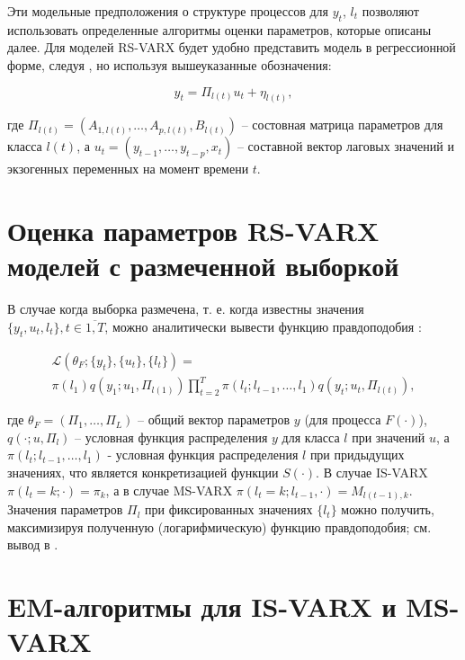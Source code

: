 \documentclass[a4paper,14pt]{extreport}
\begin{document}
Эти модельные предположения о структуре процессов для $y_t$, $l_t$ позволяют использовать определенные алгоритмы оценки параметров, которые описаны далее. Для моделей RS-VARX будет удобно представить модель в регрессионной форме, следуя \cite{malNovopMSVARX}, но используя вышеуказанные обозначения:

\begin{equation}
	y_t = \Pi_{l(t)} u_t + \eta_{l(t)} ,
	\label{eq:rs_varx_as_regression}
\end{equation}

\noindent
где $ \Pi_{l(t)} = (A_{1, l(t)}, \dots, A_{p, l(t)}, B_{l(t)}) $ -- состовная матрица параметров для класса $l(t)$, 
а $ u_t = (y_{t-1}, \dots, y_{t-p}, x_{t}) $ -- составной вектор лаговых значений и экзогенных переменных на момент времени $t$.

\section{Оценка параметров RS-VARX моделей с размеченной выборкой}

В случае когда выборка размечена, т. е. когда известны значения $\{y_t, u_t, l_t\}, t \in \overline{1,T}$, можно аналитически вывести функцию правдоподобия \cite{malNovopMSVARX}:

\begin{equation}
	\begin{multlined}
		\mathcal{L}(\theta_F; \{y_t\}, \{u_t\}, \{l_t\}) ={} \\
		\pi(l_1) q(y_1; u_1, \Pi_{l(1)}) 
		\prod\limits_{t=2}^{T}{ 
		\pi(l_t; l_{t-1}, \dots, l_1) q(y_t; u_t, \Pi_{l(t)}) 
		} ,
	\end{multlined}
	\label{eq:rs_varx_loglike}
\end{equation}

\noindent
где $\theta_F = (\Pi_1, \dots, \Pi_L)$ -- общий вектор параметров $y$ (для процесса $F(\cdot)$), $q(\cdot; u, \Pi_l)$ -- условная функция распределения $y$ для класса $l$ при значений $u$, а $\pi(l_t; l_{t-1}, \dots, l_1)$ - условная функция распределения $l$ при придыдущих значениях, что является конкретизацией функции $S(\cdot)$. В случае IS-VARX $\pi(l_t = k; \cdot) = \pi_k$, а в случае MS-VARX $\pi(l_t = k; l_{t-1}, \cdot) = M_{l(t-1), k}$.
Значения параметров $\Pi_l$ при фиксированных значениях $\{l_t\}$ можно получить, максимизируя полученную (логарифмическую) функцию правдоподобия; см. вывод в \cite{malNovopMSVARX}.


\section{EM-алгоритмы для IS-VARX и MS-VARX}
\end{document}
